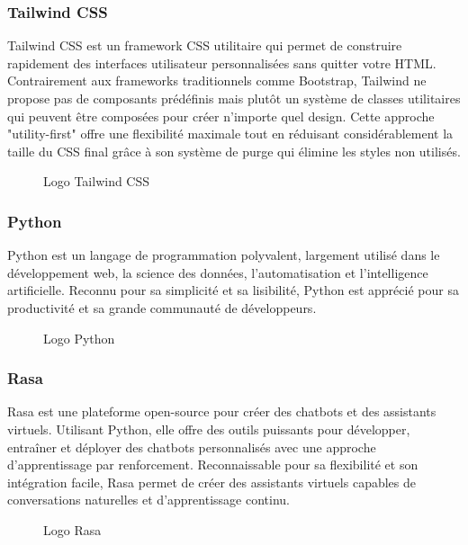 \subsubsection*{Tailwind CSS}
Tailwind CSS est un framework CSS utilitaire qui permet de construire rapidement des interfaces utilisateur personnalisées sans quitter votre HTML. Contrairement aux frameworks traditionnels comme Bootstrap, Tailwind ne propose pas de composants prédéfinis mais plutôt un système de classes utilitaires qui peuvent être composées pour créer n'importe quel design. Cette approche "utility-first" offre une flexibilité maximale tout en réduisant considérablement la taille du CSS final grâce à son système de purge qui élimine les styles non utilisés.\cite{b15}
\begin{figure}[H]
\centering
{}
\caption{Logo Tailwind CSS}
\end{figure}

\subsubsection*{Python}
Python est un langage de programmation polyvalent, largement utilisé dans le développement web, la science des données, l'automatisation et l'intelligence artificielle. Reconnu pour sa simplicité et sa lisibilité, Python est apprécié pour sa productivité et sa grande communauté de développeurs.\cite{b16}
\begin{figure}[H]
\centering
{}
\caption{Logo Python}
\end{figure}

\subsubsection*{Rasa}
Rasa est une plateforme open-source pour créer des chatbots et des assistants virtuels. Utilisant Python, elle offre des outils puissants pour développer, entraîner et déployer des chatbots personnalisés avec une approche d'apprentissage par renforcement. Reconnaissable pour sa flexibilité et son intégration facile, Rasa permet de créer des assistants virtuels capables de conversations naturelles et d'apprentissage continu.\cite{b17}
\begin{figure}[H]
\centering
{}
\caption{Logo Rasa}
\end{figure}

